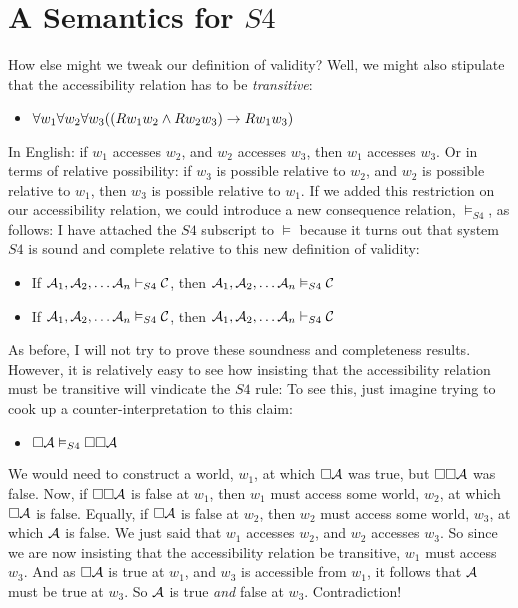 \section{A Semantics for $S4$}
\label{SemanticsS4}

How else might we tweak our definition of validity? Well, we might also stipulate that the accessibility relation has to be \emph{transitive}:
\begin{itemize}
\item $\forall w_1\forall w_2\forall w_3 ((Rw_1w_2 \wedge Rw_2w_3)\rightarrow Rw_1w_3)$
\end{itemize}
In English: if $w_1$ accesses $w_2$, and $w_2$ accesses $w_3$, then $w_1$ accesses $w_3$. Or in terms of relative possibility: if $w_3$ is possible relative to $w_2$, and $w_2$ is possible relative to $w_1$, then $w_3$ is possible relative to $w_1$. If we added this restriction on our accessibility relation, we could introduce a new consequence relation, $\vDash_{S4}$, as follows:
I have attached the $S4$ subscript to $\vDash$ because it turns out that system $S4$ is sound and complete relative to this new definition of validity:
\begin{itemize}
\item If $\mathcal{A}_1,\mathcal{A}_2, \dots \mathcal{A}_n\vdash_{S4}\mathcal{C}$, then $\mathcal{A}_1,\mathcal{A}_2, \dots \mathcal{A}_n\vDash_{S4}\mathcal{C}$
\item If $\mathcal{A}_1,\mathcal{A}_2, \dots \mathcal{A}_n\vDash_{S4}\mathcal{C}$, then $\mathcal{A}_1,\mathcal{A}_2, \dots \mathcal{A}_n\vdash_{S4}\mathcal{C}$
\end{itemize}
As before, I will not try to prove these soundness and completeness results. However, it is relatively easy to see how insisting that the accessibility relation must be transitive will vindicate the $S4$ rule:
To see this, just imagine trying to cook up a counter-interpretation to this claim:
\begin{itemize}
\item[]$\Box\mathcal{A} \vDash_{S4} \Box \Box \mathcal{A}$
\end{itemize}
We would need to construct a world, $w_1$, at which $\Box\mathcal{A}$ was true, but $\Box \Box \mathcal{A}$ was false. Now, if $\Box \Box \mathcal{A}$ is false at $w_1$, then $w_1$ must access some world, $w_2$, at which $\Box\mathcal{A}$ is false. Equally, if $\Box \mathcal{A}$ is false at $w_2$, then $w_2$ must access some world, $w_3$, at which $\mathcal{A}$ is false. We just said that $w_1$ accesses $w_2$, and $w_2$ accesses $w_3$. So since we are now insisting that the accessibility relation be transitive, $w_1$ must access $w_3$. And as $\Box\mathcal{A}$ is true at $w_1$, and $w_3$ is accessible from $w_1$, it follows that $\mathcal{A}$ must be true at $w_3$. So $\mathcal{A}$ is true \emph{and} false at $w_3$. Contradiction!

